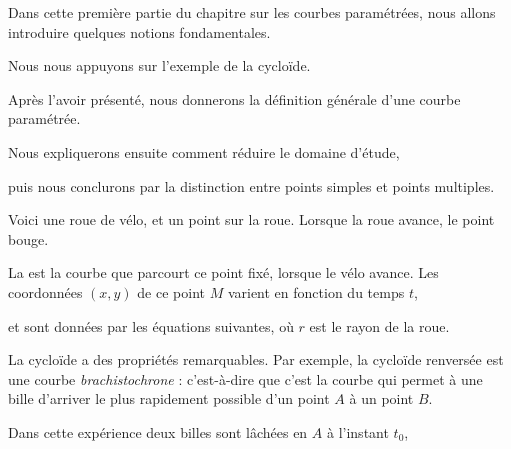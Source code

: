 






\debuttexte


\diapo

\change

Dans cette première partie du chapitre sur les courbes paramétrées, nous allons introduire quelques notions fondamentales.

\change

Nous nous appuyons sur l'exemple de la cycloïde.

\change

Après l'avoir présenté, nous donnerons la définition générale d'une courbe paramétrée.

\change

Nous expliquerons ensuite comment réduire le domaine d'étude,

\change 

puis nous conclurons par la distinction entre points simples et points multiples. 

\diapo

Voici une roue de vélo, et un point sur la roue. Lorsque la roue avance, le point bouge.

\change
\change
\change
\change

La  est la courbe que parcourt ce point fixé, lorsque le vélo avance. 
Les coordonnées $(x,y)$ 
de ce point $M$ varient
en fonction du temps $t$, 

\change
et sont données par les équations suivantes, 
où $r$ est le rayon de la roue.

% 

\diapo

La cycloïde a des propriétés remarquables. Par exemple, la 
cycloïde renversée est une courbe \emph{brachistochrone} : 
c'est-à-dire que c'est la courbe 
qui permet à une bille d'arriver le plus rapidement possible d'un point $A$ à un point $B$.

Dans cette expérience deux billes sont lâchées en $A$ à l'instant $t_0$, 

